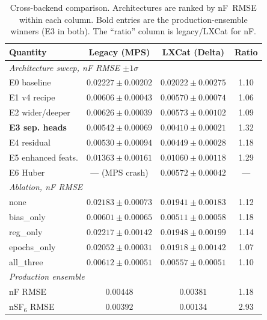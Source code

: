 \documentclass[11pt,a4paper]{article}
\begin{document}
\begin{table}[H]
  \centering
  \caption{Cross-backend comparison.  Architectures are ranked by
           nF~RMSE within each column.  Bold entries are the
           production-ensemble winners (E3 in both).  The
           ``ratio'' column is legacy/LXCat for nF.}
  \label{tab:cross-backend}
  \small
  \begin{tabular}{l c c c}
    \toprule
    Quantity & Legacy (MPS) & LXCat (Delta) & Ratio \\
    \midrule
    \multicolumn{4}{l}{\emph{Architecture sweep, nF RMSE $\pm 1\sigma$}} \\
    \quad E0 baseline        & $0.02227 \pm 0.00202$ & $0.02022 \pm 0.00275$ & 1.10 \\
    \quad E1 v4 recipe       & $0.00606 \pm 0.00043$ & $0.00570 \pm 0.00074$ & 1.06 \\
    \quad E2 wider/deeper    & $0.00626 \pm 0.00039$ & $0.00573 \pm 0.00102$ & 1.09 \\
    \quad \textbf{E3 sep. heads} & $\mathbf{0.00542 \pm 0.00069}$ & $\mathbf{0.00410 \pm 0.00021}$ & 1.32 \\
    \quad E4 residual        & $0.00530 \pm 0.00094$ & $0.00449 \pm 0.00028$ & 1.18 \\
    \quad E5 enhanced feats. & $0.01363 \pm 0.00161$ & $0.01060 \pm 0.00118$ & 1.29 \\
    \quad E6 Huber           & --- (MPS crash)        & $0.00572 \pm 0.00042$ & --- \\
    \midrule
    \multicolumn{4}{l}{\emph{Ablation, nF RMSE}} \\
    \quad none               & $0.02183 \pm 0.00073$ & $0.01941 \pm 0.00183$ & 1.12 \\
    \quad bias\_only         & $0.00601 \pm 0.00065$ & $0.00511 \pm 0.00058$ & 1.18 \\
    \quad reg\_only          & $0.02217 \pm 0.00142$ & $0.01948 \pm 0.00199$ & 1.14 \\
    \quad epochs\_only       & $0.02052 \pm 0.00031$ & $0.01918 \pm 0.00142$ & 1.07 \\
    \quad all\_three         & $0.00612 \pm 0.00051$ & $0.00557 \pm 0.00051$ & 1.10 \\
    \midrule
    \multicolumn{4}{l}{\emph{Production ensemble}} \\
    \quad nF RMSE            & $0.00448$              & $0.00381$              & 1.18 \\
    \quad nSF$_6$ RMSE       & $0.00392$              & $0.00134$              & 2.93 \\
    \bottomrule
  \end{tabular}
\end{table}
\end{document}
